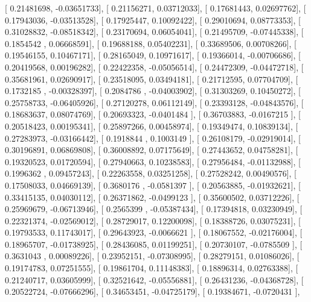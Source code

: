 \documentclass{article}
\begin{document}
       [ 0.21481698, -0.03651733],
       [ 0.21156271,  0.03712033],
       [ 0.17681443,  0.02697762],
       [ 0.17943036, -0.03513528],
       [ 0.17925447,  0.10092422],
       [ 0.29010694,  0.08773353],
       [ 0.31028832, -0.08518342],
       [ 0.23170694,  0.06054041],
       [ 0.21495709, -0.07445338],
       [ 0.1854542 ,  0.06668591],
       [ 0.19688188,  0.05402231],
       [ 0.33689506,  0.00708266],
       [ 0.19546155,  0.10467171],
       [ 0.28165049,  0.10971617],
       [ 0.19366014, -0.00706686],
       [ 0.20419568,  0.00196282],
       [ 0.22422358, -0.05056514],
       [ 0.24472309, -0.04472718],
       [ 0.35681961,  0.02690917],
       [ 0.23518095,  0.03494181],
       [ 0.21712595,  0.07704709],
       [ 0.1732185 , -0.00328397],
       [ 0.2084786 , -0.04003902],
       [ 0.31303269,  0.10450272],
       [ 0.25758733, -0.06405926],
       [ 0.27120278,  0.06112149],
       [ 0.23393128, -0.04843576],
       [ 0.18683637,  0.08074769],
       [ 0.20693323, -0.0401484 ],
       [ 0.36703883, -0.0167215 ],
       [ 0.20518423,  0.00195341],
       [ 0.25897266,  0.00458974],
       [ 0.19349474,  0.10839134],
       [ 0.27283973, -0.03166442],
       [ 0.1918844 ,  0.1003149 ],
       [ 0.26108179, -0.02919014],
       [ 0.30196891,  0.06869808],
       [ 0.36008892,  0.07175649],
       [ 0.27443652,  0.04758281],
       [ 0.19320523,  0.01720594],
       [ 0.27940663,  0.10238583],
       [ 0.27956484, -0.01132988],
       [ 0.1996362 ,  0.09457243],
       [ 0.22263558,  0.03251258],
       [ 0.27528242,  0.00490576],
       [ 0.17508033,  0.04669139],
       [ 0.3680176 , -0.0581397 ],
       [ 0.20563885, -0.01932621],
       [ 0.33415135,  0.04030112],
       [ 0.26371862, -0.0499123 ],
       [ 0.35600502,  0.03712226],
       [ 0.25969679, -0.06713946],
       [ 0.2565399 , -0.05387434],
       [ 0.17394818,  0.03230949],
       [ 0.22321374, -0.02569012],
       [ 0.28729017,  0.12200098],
       [ 0.18388726,  0.03075231],
       [ 0.19793533,  0.11743017],
       [ 0.29643923, -0.0066621 ],
       [ 0.18067552, -0.02176004],
       [ 0.18965707, -0.01738925],
       [ 0.28436085,  0.01199251],
       [ 0.20730107, -0.0785509 ],
       [ 0.3631043 ,  0.00089226],
       [ 0.23952151, -0.07308995],
       [ 0.28279151,  0.01086026],
       [ 0.19174783,  0.07251555],
       [ 0.19861704,  0.11148383],
       [ 0.18896314,  0.02763388],
       [ 0.21240717,  0.03605999],
       [ 0.32521642, -0.05556881],
       [ 0.26431236, -0.04368728],
       [ 0.20522724, -0.07666296],
       [ 0.34653451, -0.04725179],
       [ 0.19384671, -0.0720431 ],
\end{document}
